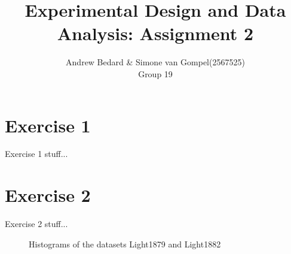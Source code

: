 \documentclass{article}
\title{Experimental Design and Data Analysis: Assignment 2}
\author{Andrew Bedard \& Simone van Gompel(2567525) \\ Group 19}
\begin{document}
  \maketitle

  \section{Exercise 1}
    Exercise 1 stuff...

  \section{Exercise 2}
    Exercise 2 stuff...
    \begin{figure}
      \caption{Histograms of the datasets Light1879 and Light1882}
      \label{fig:HistEx2}
    \end{figure}
\end{document}
